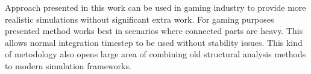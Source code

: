 Approach presented in this work can be used in gaming industry to provide more realistic 
simulations without significant extra work. For gaming purposes presented method works 
best in scenarios where connected parts are heavy. This allows normal 
integration timestep to be used without stability issues. 
This kind of metodology also opens large area of combining old structural analysis
methods to modern simulation frameworks.

